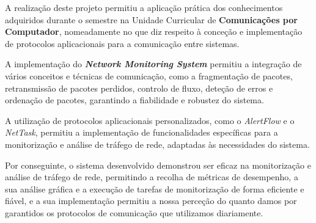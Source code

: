 \documentclass[a4paper,12pt]{scrreprt}
\begin{document}
A realização deste projeto permitiu a aplicação prática dos conhecimentos adquiridos
durante o semestre na Unidade Curricular de \textbf{Comunicações por Computador},
nomeadamente no que diz respeito à conceção e implementação de protocolos aplicacionais
para a comunicação entre sistemas. 

A implementação do \textbf{\textit{Network Monitoring System}} permitiu a integração de
vários conceitos e técnicas de comunicação, como a fragmentação de pacotes, retransmissão
de pacotes perdidos, controlo de fluxo, deteção de erros e ordenação de pacotes, garantindo
a fiabilidade e robustez do sistema.

A utilização de protocolos aplicacionais personalizados, como o \textit{AlertFlow} e o
\textit{NetTask}, permitiu a implementação de funcionalidades específicas para a
monitorização e análise de tráfego de rede, adaptadas às necessidades do sistema.


Por conseguinte, o sistema desenvolvido demonstrou ser eficaz na monitorização e
análise de tráfego de rede, permitindo a recolha de métricas de
desempenho, a sua análise gráfica e a execução de tarefas de monitorização de forma
eficiente e fiável, e a sua implementação permitiu a nossa perceção do quanto damos por garantidos
os protocolos de comunicação que utilizamos diariamente.








%

\end{document}
